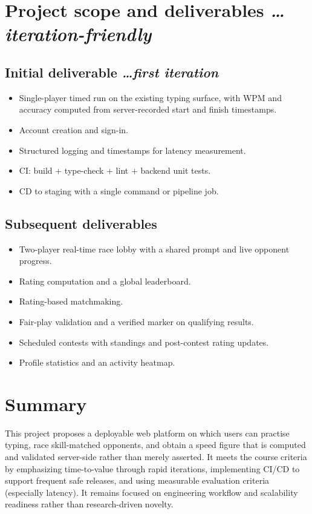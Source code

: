 \documentclass[11pt,a4paper]{article}
\newcommand{\BvrHint}[1]{%
  {\normalfont\normalsize\itshape\hfill #1}}
\begin{document}
\section{Project scope and deliverables %
\BvrHint{\ldots iteration-friendly}}
\subsection{Initial deliverable %
\BvrHint{\ldots first iteration}}
\begin{itemize}[leftmargin=0.7cm]
    \item Single-player timed run on the existing typing surface, with WPM and accuracy computed from server-recorded start and finish timestamps.
    \item Account creation and sign-in.
    \item Structured logging and timestamps for latency measurement.
    \item CI: build + type-check + lint + backend unit tests.
    \item CD to staging with a single command or pipeline job.
\end{itemize}

\subsection{Subsequent deliverables}
\begin{itemize}[leftmargin=0.7cm]
    \item Two-player real-time race lobby with a shared prompt and live opponent progress.
    \item Rating computation and a global leaderboard.
    \item Rating-based matchmaking.
    \item Fair-play validation and a verified marker on qualifying results.
    \item Scheduled contests with standings and post-contest rating updates.
    \item Profile statistics and an activity heatmap.
\end{itemize}

\section{Summary}
This project proposes a deployable web platform on which users
can practise typing, race skill-matched opponents, and obtain a
speed figure that is computed and validated server-side rather
than merely asserted. It meets the course criteria by emphasizing
time-to-value through rapid iterations, implementing CI/CD to
support frequent safe releases, and using measurable evaluation
criteria (especially latency). It remains focused on engineering
workflow and scalability readiness rather than research-driven
novelty.
\end{document}
